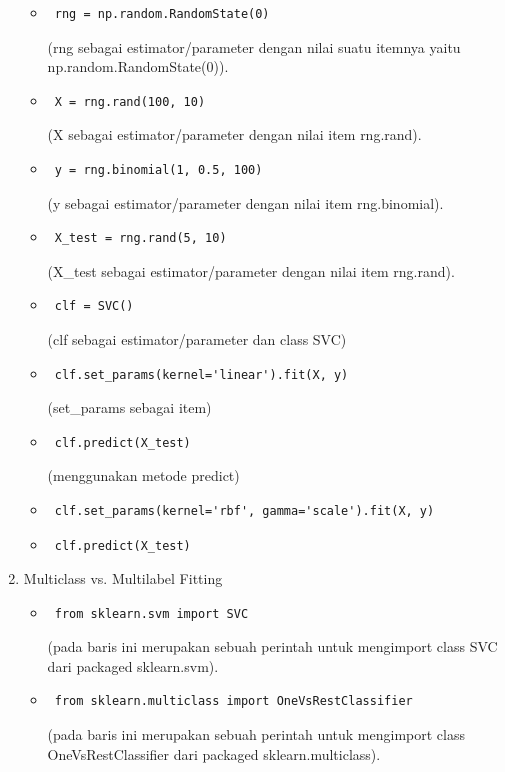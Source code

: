 \begin{enumerate}
\begin{itemize}
\item\begin{verbatim} rng = np.random.RandomState(0)\end{verbatim}(rng sebagai estimator/parameter dengan nilai suatu itemnya yaitu np.random.RandomState(0)).
\item\begin{verbatim} X = rng.rand(100, 10)\end{verbatim}(X sebagai estimator/parameter dengan nilai item rng.rand).
\item\begin{verbatim} y = rng.binomial(1, 0.5, 100)\end{verbatim}(y sebagai estimator/parameter dengan nilai item rng.binomial).
\item\begin{verbatim} X_test = rng.rand(5, 10)\end{verbatim}(X\_test sebagai estimator/parameter dengan nilai item rng.rand).
\item\begin{verbatim} clf = SVC()\end{verbatim}(clf sebagai estimator/parameter dan class SVC)
\item\begin{verbatim} clf.set_params(kernel='linear').fit(X, y)\end{verbatim}(set\_params sebagai item)
\item\begin{verbatim} clf.predict(X_test)\end{verbatim}(menggunakan metode predict) 
\item\begin{verbatim} clf.set_params(kernel='rbf', gamma='scale').fit(X, y)\end{verbatim} 
\item\begin{verbatim} clf.predict(X_test)\end{verbatim}
\end{itemize}
\item Multiclass vs. Multilabel Fitting
\begin{itemize}
\item\begin{verbatim} from sklearn.svm import SVC\end{verbatim}(pada baris ini merupakan sebuah perintah untuk mengimport class SVC dari packaged sklearn.svm).
\item\begin{verbatim} from sklearn.multiclass import OneVsRestClassifier\end{verbatim}(pada baris ini merupakan sebuah perintah untuk mengimport class OneVsRestClassifier dari packaged sklearn.multiclass).

\end{itemize}
\end{enumerate}
